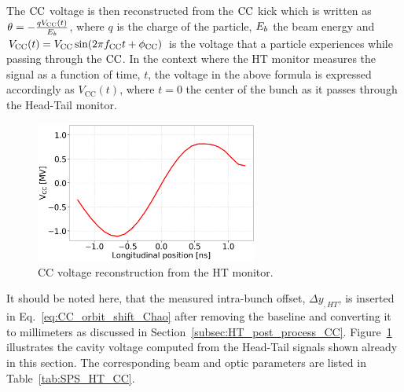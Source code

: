 The ${\mathrm{CC}}$ voltage is then reconstructed from the ${\mathrm{CC}}$ kick which is written as $\theta = - \frac{q V_\mathrm{CC}(t)}{{E_b}}$, where $q$ is the charge of the particle, ${E_b}$ the beam energy and $V_\mathrm{CC}(t) = V_\mathrm{CC} \sin(2 \pi {f_\mathrm{CC}} t + \phi_\mathrm{CC}) $ is the voltage that a particle experiences while passing through the ${\mathrm{CC}}$. In the context where the HT monitor measures the signal as a function of time, $t$, the voltage in the above formula is expressed accordingly as $V_\mathrm{CC}(t)$, where $t=0$ the center of the bunch as it passes through the Head-Tail monitor.

\begin{figure}[!h]
\centering         
\includegraphics[width=0.65\textwidth]{images/Ch4/HT_VCC_callibration_20180530_135105_CC_post_processing.png}
    \caption{CC voltage reconstruction from the HT monitor.}
    \label{fig:VCC_from_HT_monitor_measurement}
\end{figure}

It should be noted here, that the measured intra-bunch offset, $\Delta y_{, HT}$, is inserted in Eq.~\eqref{eq:CC_orbit_shift_Chao} after removing the baseline and converting it to millimeters as discussed in Section~\ref{subsec:HT_post_process_CC}. Figure~\ref{fig:VCC_from_HT_monitor_measurement} illustrates the cavity voltage computed from the Head-Tail signals shown already in this section. The corresponding beam and optic parameters are listed in Table~\ref{tab:SPS_HT_CC}.

